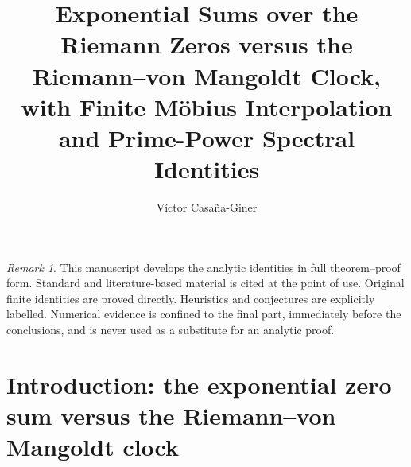 \documentclass[11pt]{amsart}
\title[Exponential Zeta Walks and Prime-Power Identities]{
Exponential Sums over the Riemann Zeros versus the
Riemann--von Mangoldt Clock, with Finite Möbius Interpolation
and Prime-Power Spectral Identities
}
\author{Víctor Casaña-Giner}
\date{}
\numberwithin{equation}{section}
\theoremstyle{plain}
\theoremstyle{definition}
\theoremstyle{remark}
\newtheorem{remark}[theorem]{Remark}
\newcommand{\1}{\mathbf{1}}
\begin{document}
\maketitle
\tableofcontents

\bigskip

\begin{remark}
\label{rem:status_policy}
This manuscript develops the analytic identities in full theorem--proof
form.  Standard and literature-based material is cited at the point of use.
Original finite identities are proved directly.  Heuristics and conjectures
are explicitly labelled.  Numerical evidence is confined to the final part,
immediately before the conclusions, and is never used as a substitute for an
analytic proof.
\end{remark}


\section{Introduction: the exponential zero sum versus the Riemann--von Mangoldt clock}
\label{sec:introduction}
\end{document}
